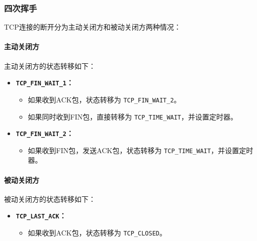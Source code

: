 \documentclass[11pt]{article}
\begin{document}
\subsubsection{四次挥手}
TCP连接的断开分为主动关闭方和被动关闭方两种情况：

\paragraph{主动关闭方}
主动关闭方的状态转移如下：
\begin{itemize}
    \item \textbf{\texttt{TCP\_FIN\_WAIT\_1}：}
    \begin{itemize}
        \item 如果收到ACK包，状态转移为 \texttt{TCP\_FIN\_WAIT\_2}。
        \item 如果同时收到FIN包，直接转移为 \texttt{TCP\_TIME\_WAIT}，并设置定时器。
    \end{itemize}
    \item \textbf{\texttt{TCP\_FIN\_WAIT\_2}：}
    \begin{itemize}
        \item 如果收到FIN包，发送ACK包，状态转移为 \texttt{TCP\_TIME\_WAIT}，并设置定时器。
    \end{itemize}
\end{itemize}

\paragraph{被动关闭方}
被动关闭方的状态转移如下：
\begin{itemize}
    \item \textbf{\texttt{TCP\_LAST\_ACK}：}
    \begin{itemize}
        \item 如果收到ACK包，状态转移为 \texttt{TCP\_CLOSED}。
    \end{itemize}
\end{itemize}
\end{document}

